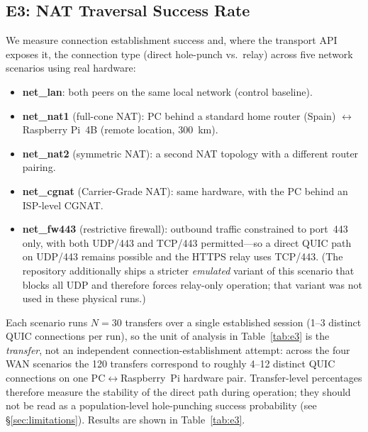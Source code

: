 \documentclass[a4paper,fleqn]{cas-dc}
\begin{document}
\subsection{E3: NAT Traversal Success Rate}
\label{sec:e3}

We measure connection establishment success and, where the transport API exposes it, the connection type (direct hole-punch vs.~relay) across five network scenarios using real hardware:

\begin{itemize}
    \item \textbf{net\_lan}: both peers on the same local network (control baseline).
    \item \textbf{net\_nat1} (full-cone NAT): PC behind a standard home router (Spain) $\leftrightarrow$ Raspberry Pi~4B (remote location, 300~km).
    \item \textbf{net\_nat2} (symmetric NAT): a second NAT topology with a different router pairing.
    \item \textbf{net\_cgnat} (Carrier-Grade NAT): same hardware, with the PC behind an ISP-level CGNAT.
    \item \textbf{net\_fw443} (restrictive firewall): outbound traffic constrained to port~443 only, with both UDP/443 and TCP/443 permitted---so a direct QUIC path on UDP/443 remains possible and the HTTPS relay uses TCP/443. (The repository additionally ships a stricter \emph{emulated} variant of this scenario that blocks all UDP and therefore forces relay-only operation; that variant was not used in these physical runs.)
\end{itemize}

Each scenario runs $N{=}30$ transfers over a single established session (1--3 distinct QUIC connections per run), so the unit of analysis in Table~\ref{tab:e3} is the \emph{transfer}, not an independent connection-establishment attempt: across the four WAN scenarios the 120 transfers correspond to roughly 4--12 distinct QUIC connections on one PC$\leftrightarrow$Raspberry~Pi hardware pair. Transfer-level percentages therefore measure the stability of the direct path during operation; they should not be read as a population-level hole-punching success probability (see \S\ref{sec:limitations}). Results are shown in Table~\ref{tab:e3}.
\end{document}
